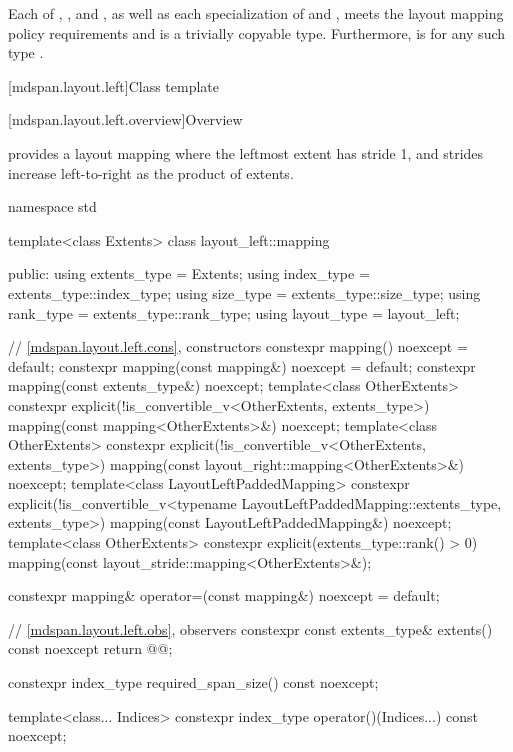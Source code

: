 \pnum
Each of , , and ,
as well as each specialization of
 and ,
meets the layout mapping policy requirements and is a trivially copyable type.
Furthermore,
 is 
for any such type .

[mdspan.layout.left]{Class template }

[mdspan.layout.left.overview]{Overview}

\pnum
{} provides a layout mapping
where the leftmost extent has stride 1, and
strides increase left-to-right as the product of extents.

\begin{codeblock}
namespace std {
  template<class Extents>
  class layout_left::mapping {
  public:
    using extents_type = Extents;
    using index_type = extents_type::index_type;
    using size_type = extents_type::size_type;
    using rank_type = extents_type::rank_type;
    using layout_type = layout_left;

    // \ref{mdspan.layout.left.cons}, constructors
    constexpr mapping() noexcept = default;
    constexpr mapping(const mapping&) noexcept = default;
    constexpr mapping(const extents_type&) noexcept;
    template<class OtherExtents>
      constexpr explicit(!is_convertible_v<OtherExtents, extents_type>)
        mapping(const mapping<OtherExtents>&) noexcept;
    template<class OtherExtents>
      constexpr explicit(!is_convertible_v<OtherExtents, extents_type>)
        mapping(const layout_right::mapping<OtherExtents>&) noexcept;
    template<class LayoutLeftPaddedMapping>
      constexpr explicit(!is_convertible_v<typename LayoutLeftPaddedMapping::extents_type,
                                           extents_type>)
        mapping(const LayoutLeftPaddedMapping&) noexcept;
    template<class OtherExtents>
      constexpr explicit(extents_type::rank() > 0)
        mapping(const layout_stride::mapping<OtherExtents>&);

    constexpr mapping& operator=(const mapping&) noexcept = default;

    // \ref{mdspan.layout.left.obs}, observers
    constexpr const extents_type& extents() const noexcept { return @@; }

    constexpr index_type required_span_size() const noexcept;

    template<class... Indices>
      constexpr index_type operator()(Indices...) const noexcept;

}}
\end{codeblock}
